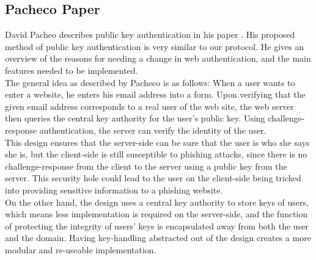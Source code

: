 \documentclass[11pt]{article}
\begin{document}
\subsection{Pacheco Paper}
David Pacheo describes public key authentication in his paper \cite{pacheco}. His proposed method of public key authentication is very similar to our protocol. He gives an overview of the reasons for needing a change in web authentication, and the main features needed to be implemented. \\
The general idea as described by Pacheco is as follows: When a user wants to enter a website, he enters his email address into a form. Upon verifying that the given email address corresponds to a real user of the web site, the web server then queries the central key authority for the user's public key. Using challenge-response authentication, the server can verify the identity of the user.\\
	This design ensures that the server-side can be sure that the user is who she says she is, but the client-side is still susceptible to phishing attacks, since there is no challenge-response from the client to the server using a public key from the server.  This security hole could lead to the user on the client-side being tricked into providing sensitive information to a phishing website.\\
	On the other hand, the design uses a central key authority to store keys of users, which means less implementation is required on the server-side, and the function of protecting the integrity of users' keys is encapsulated away from both the user and the domain.  Having key-handling abstracted out of the design creates a more modular and re-useable implementation.\\
\end{document}
